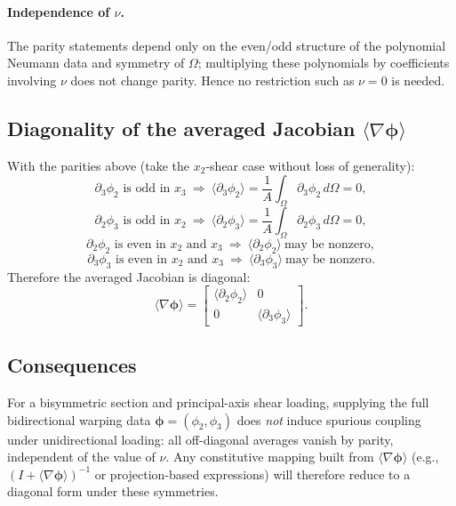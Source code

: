 \paragraph{Independence of \(\nu\).}
The parity statements depend only on the even/odd structure of the polynomial Neumann data and symmetry of \(\Omega\); multiplying these polynomials by coefficients involving \(\nu\) does not change parity. Hence no restriction such as \(\nu=0\) is needed.

\subsection*{Diagonality of the averaged Jacobian \(\langle\nabla\boldsymbol\phi\rangle\)}
With the parities above (take the \(x_2\)-shear case without loss of generality):
\[
\partial_3\phi_2 \text{ is odd in }x_3 \ \Rightarrow\ \langle \partial_3\phi_2\rangle=\frac{1}{A}\int_\Omega \partial_3\phi_2\,d\Omega=0,
\]
\[
\partial_2\phi_3 \text{ is odd in }x_2 \ \Rightarrow\ \langle \partial_2\phi_3\rangle=\frac{1}{A}\int_\Omega \partial_2\phi_3\,d\Omega=0,
\]
\[
\partial_2\phi_2 \text{ is even in }x_2\text{ and }x_3 \ \Rightarrow\ \langle \partial_2\phi_2\rangle\ \text{may be nonzero},
\]
\[
\partial_3\phi_3 \text{ is even in }x_2\text{ and }x_3 \ \Rightarrow\ \langle \partial_3\phi_3\rangle\ \text{may be nonzero}.
\]
Therefore the averaged Jacobian is diagonal:
\[
\boxed{\ 
\Big\langle \nabla\boldsymbol\phi \Big\rangle
=
\begin{bmatrix}
\langle \partial_2\phi_2\rangle & 0\\[2pt]
0 & \langle \partial_3\phi_3\rangle
\end{bmatrix}.\
}
\]

\subsection*{Consequences}
For a bisymmetric section and principal-axis shear loading, supplying the full bidirectional warping data \(\boldsymbol\phi=(\phi_2,\phi_3)\) does \emph{not} induce spurious coupling under unidirectional loading: all off-diagonal averages vanish by parity, independent of the value of \(\nu\). Any constitutive mapping built from \(\langle \nabla\boldsymbol\phi\rangle\) (e.g., \((I+\langle\nabla\boldsymbol\phi\rangle)^{-1}\) or projection-based expressions) will therefore reduce to a diagonal form under these symmetries.
